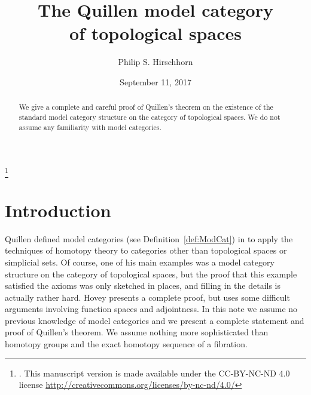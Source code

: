 \documentclass[12pt]{amsart}
\numberwithin{equation}{section}
\theoremstyle{slplain}
\theoremstyle{definition}
\theoremstyle{remark}
\newcommand{\defref}{Definition~\ref}
\begin{document}
\title[The Quillen model category of topological spaces]{The Quillen
  model category\\of topological spaces}

\author{Philip S. Hirschhorn}

\address{Department of Mathematics\\
  Wellesley College\\
  106 Central Street\\
  Wellesley, Massachusetts 02481}



\begin{abstract}
  We give a complete and careful proof of Quillen's theorem on the
  existence of the standard model category structure on the category
  of topological spaces. We do not assume any familiarity with model
  categories.
\end{abstract}

\thanks{. This manuscript version is made available
  under the CC-BY-NC-ND 4.0 license
  \url{http://creativecommons.org/licenses/by-nc-nd/4.0/}}



\date{September 11, 2017}

\maketitle

\tableofcontents
\newpage

\section{Introduction}
\label{sec:Intro}

Quillen defined model categories (see \defref{def:ModCat}) in
\cites{Q:HomAlg,Q:RHT} to apply the techniques of homotopy theory to
categories other than topological spaces or simplicial sets.  Of
course, one of his main examples was a model category structure on the
category of topological spaces, but the proof that this example
satisfied the axioms was only sketched in places, and filling in the
details is actually rather hard.  Hovey \cite{Hovey:MC} presents a
complete proof, but uses some difficult arguments involving function
spaces and adjointness.  In this note we assume no previous knowledge
of model categories and we present a complete statement and proof of
Quillen's theorem.  We assume nothing more sophisticated than homotopy
groups and the exact homotopy sequence of a fibration.
\end{document}
